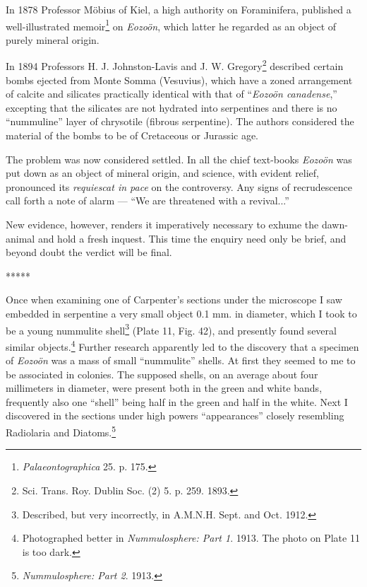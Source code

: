 \documentclass[a4paper, 12pt, oneside, landscape]{article}
\begin{document}
In 1878 Professor Möbius of Kiel, a high authority on Foraminifera, published a well-illustrated memoir\footnote{\emph{Palaeontographica} 25. p. 175.} on \emph{Eozoön}, which latter he regarded as an object of purely mineral origin.

In 1894 Professors H. J. Johnston-Lavis and J. W. Gregory\footnote{Sci. Trans. Roy. Dublin Soc. (2) 5. p. 259. 1893.} described certain bombs ejected from Monte Somma (Vesuvius), which have a zoned arrangement of calcite and silicates practically identical with that of ``\emph{Eozoön canadense},'' excepting that the silicates are not hydrated into serpentines and there is no ``nummuline'' layer of chrysotile (fibrous serpentine). The authors considered the material of the bombs to be of Cretaceous or Jurassic age.

The problem was now considered settled. In all the chief text-books \emph{Eozoön} was put down as an object of mineral origin, and science, with evident relief, pronounced its \emph{requiescat in pace} on the controversy. Any signs of recrudescence call forth a note of alarm --- ``We are threatened with a revival...''

New evidence, however, renders it imperatively necessary to exhume the dawn-animal and hold a fresh inquest. This time the enquiry need only be brief, and beyond doubt the verdict will be final.

\centerline{*\hspace{15mm}*\hspace{15mm}*\hspace{15mm}*\hspace{15mm}*}
\bigskip

Once when examining one of Carpenter's sections under the microscope I saw embedded in serpentine a very small object 0.1 mm. in diameter, which I took to be a young nummulite shell\footnote{Described, but very incorrectly, in A.M.N.H. Sept. and Oct. 1912.} (Plate 11, Fig. 42), and presently found several similar objects.\footnote{Photographed better in \emph{Nummulosphere: Part 1}. 1913. The photo on Plate 11 is too dark.} Further research apparently led to the discovery that a specimen of \emph{Eozoön} was a mass of small ``nummulite'' shells. At first they seemed to me to be associated in colonies. The supposed shells, on an average about four millimeters in diameter, were present both in the green and white bands, frequently also one ``shell'' being half in the green and half in the white. Next I discovered in the sections under high powers ``appearances'' closely resembling Radiolaria and Diatoms.\footnote{\emph{Nummulosphere: Part 2}. 1913.}
\end{document}
